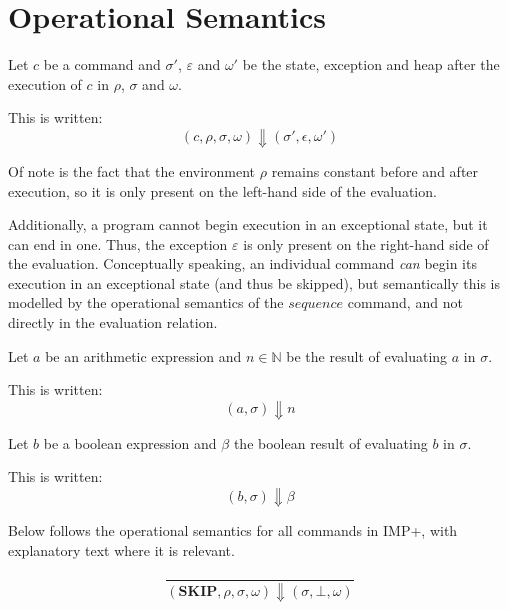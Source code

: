 \section{Operational Semantics}\label{sec:opsem}

\begin{notation}
Let $c$ be a command and $\sigma'$, $\varepsilon$ and $\omega'$ be the state, exception and heap after the execution of $c$ in $\rho$, $\sigma$ and $\omega$.

This is written:
\begin{equation}
(c,\rho,\sigma,\omega) \Downarrow (\sigma',\epsilon,\omega')
\end{equation}

Of note is the fact that the environment $\rho$ remains constant before and after execution, so it is only present on the left-hand side of the evaluation.

Additionally, a program cannot begin execution in an exceptional state, but it can end in one. Thus, the exception $\varepsilon$ is only present on the right-hand side of the evaluation. Conceptually speaking, an individual command \emph{can} begin its execution in an exceptional state (and thus be skipped), but semantically this is modelled by the operational semantics of the $sequence$ command, and not directly in the evaluation relation.
\end{notation}

\begin{notation}
Let $a$ be an arithmetic expression and $n\in\mathbb{N}$ be the result of evaluating $a$ in $\sigma$.

This is written:
\begin{equation}
(a,\sigma) \Downarrow n
\end{equation}
\end{notation}

\begin{notation}
Let $b$ be a boolean expression and $\beta$ the boolean result of evaluating $b$ in $\sigma$.

This is written:
\begin{equation}
(b,\sigma) \Downarrow \beta
\end{equation}
\end{notation}

Below follows the operational semantics for all commands in IMP+, with explanatory text where it is relevant.

\begin{equation}
\frac{}{(\textbf{SKIP}, \rho, \sigma, \omega) \Downarrow (\sigma, \bot, \omega)}
\end{equation}

